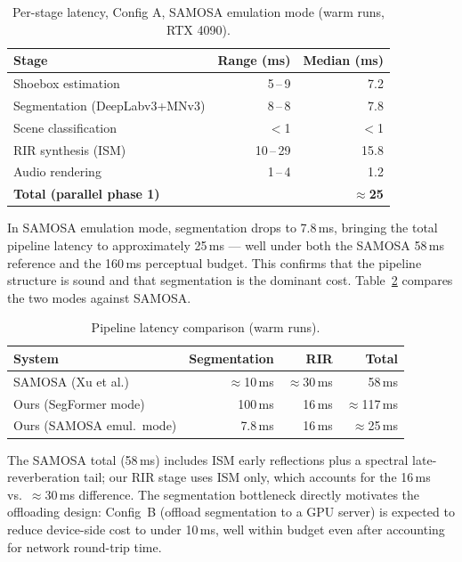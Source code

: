 \documentclass[11pt]{article}
\begin{document}
\begin{table}[H]
\small\centering
\caption{Per-stage latency, Config A, SAMOSA emulation mode (warm runs, RTX 4090).}
\label{tab:results-samosa}
\begin{tabular}{@{}lrr@{}}
\toprule
\textbf{Stage} & \textbf{Range (ms)} & \textbf{Median (ms)}\\
\midrule
Shoebox estimation           & 5\,--\,9   & 7.2\\
Segmentation (DeepLabv3+MNv3) & 8\,--\,8  & 7.8\\
Scene classification         & $<$1       & $<$1\\
RIR synthesis (ISM)          & 10\,--\,29 & 15.8\\
Audio rendering              & 1\,--\,4   & 1.2\\
\midrule
\textbf{Total (parallel phase 1)} & & \textbf{$\approx$25}\\
\bottomrule
\end{tabular}
\end{table}

In SAMOSA emulation mode, segmentation drops to 7.8\,ms, bringing the
total pipeline latency to approximately 25\,ms --- well under both the
SAMOSA 58\,ms reference and the 160\,ms perceptual budget. This confirms
that the pipeline structure is sound and that segmentation is the dominant
cost. Table~\ref{tab:comparison} compares the two modes against SAMOSA.

\begin{table}[H]
\small\centering
\caption{Pipeline latency comparison (warm runs).}
\label{tab:comparison}
\begin{tabular}{@{}lrrr@{}}
\toprule
\textbf{System} & \textbf{Segmentation} & \textbf{RIR} & \textbf{Total}\\
\midrule
SAMOSA (Xu et al.)         & $\approx$10\,ms & $\approx$30\,ms & 58\,ms\\
Ours (SegFormer mode)      & 100\,ms          & 16\,ms          & $\approx$117\,ms\\
Ours (SAMOSA emul.\ mode)  & 7.8\,ms          & 16\,ms          & $\approx$25\,ms\\
\bottomrule
\end{tabular}
\end{table}

The SAMOSA total (58\,ms) includes ISM early reflections plus a spectral
late-reverberation tail; our RIR stage uses ISM only, which accounts for
the 16\,ms vs.\ $\approx$30\,ms difference. The segmentation bottleneck
directly motivates the offloading design: Config~B (offload segmentation
to a GPU server) is expected to reduce device-side cost to under 10\,ms,
well within budget even after accounting for network round-trip time.
\end{document}
